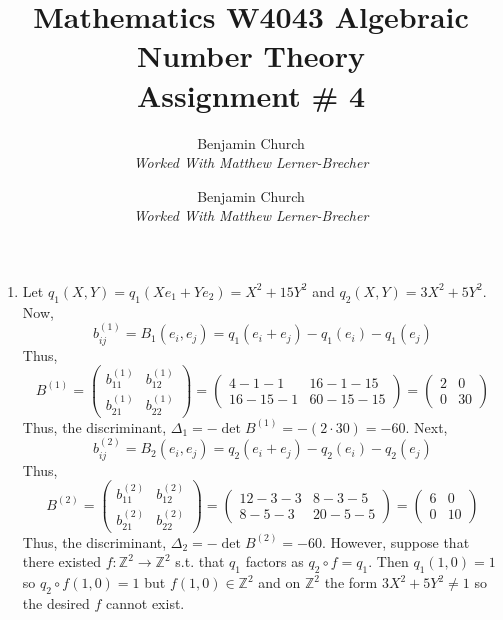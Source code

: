 \documentclass[12pt]{extarticle}
\author{Benjamin Church \\ \textit{Worked With Matthew Lerner-Brecher} }
\newcommand{\Z}{\mathbb{Z}}
\newcommand{\atitle}[1]{\title{%
	\large \textbf{Mathematics W4043 Algebraic Number Theory
	\\ Assignment \# #1} \vspace{-2ex}}
\author{Benjamin Church \\ \textit{Worked With Matthew Lerner-Brecher} }
\maketitle}
\begin{document}
\atitle{4}

\begin{enumerate}
\item Let $q_1(X, Y) = q_1(X e_1 + Y e_2) = X^2 + 15 Y^2$ and $q_2(X, Y) = 3 X^2 + 5 Y^2$. Now, \[b_{ij}^{(1)} = B_1(e_i, e_j) = q_1(e_i + e_j) - q_1(e_i) - q_1(e_j)\] 
Thus, \[B^{(1)} = 
\begin{pmatrix}
b_{11}^{(1)}  & b_{12}^{(1)}  \\
b_{21}^{(1)}  & b_{22}^{(1)}  			
\end{pmatrix} = 
\begin{pmatrix}
4 - 1 - 1 & 16 - 1 - 15 \\
16 - 15 - 1 & 60 - 15 - 15 			
\end{pmatrix} = 
\begin{pmatrix}
2 & 0 \\
0 & 30			
\end{pmatrix}\]
Thus, the discriminant, $\Delta_1 = - \det{B^{(1)}} = -(2 \cdot 30) = - 60$.
Next, \[b_{ij}^{(2)} = B_2(e_i, e_j) = q_2(e_i + e_j) - q_2(e_i) - q_2(e_j)\] 
Thus, \[B^{(2)} = 
\begin{pmatrix}
b_{11}^{(2)} & b_{12}^{(2)} \\
b_{21}^{(2)} & b_{22}^{(2)}			
\end{pmatrix} = 
\begin{pmatrix}
12 - 3 - 3 & 8 - 3 - 5 \\
8 - 5 - 3 & 20 - 5 - 5 			
\end{pmatrix} = 
\begin{pmatrix}
6 & 0 \\
0 & 10			
\end{pmatrix}\]
Thus, the discriminant, $\Delta_2 = - \det{B^{(2)}} = -60$.
However, suppose that there existed $f : \Z^2 \rightarrow \Z^2$ s.t. that $q_1$ factors as $q_2 \circ f = q_1$. Then $q_1(1, 0) = 1$ so $q_2 \circ f(1, 0) = 1$ but $f(1, 0) \in \Z^2$ and on $\Z^2$ the form $3 X^2 + 5 Y^2 \neq 1$ so the desired $f$ cannot exist.  



\end{enumerate}
\end{document}
